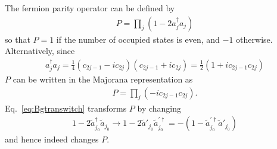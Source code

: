 The fermion parity operator can be defined by
\begin{eqnarray}
	P = \prod_j (1-2a_j^\dag a_j)
\end{eqnarray}
so that $P = 1$ if the number of occupied states is even, and $-1$ otherwise. Alternatively, since
\begin{eqnarray}
	a_j^\dag a_j = \frac{1}{4}(c_{2j-1} - ic_{2j})(c_{2j-1} + ic_{2j}) = \frac{1}{2} (1 + ic_{2j-1} c_{2j})
\end{eqnarray}
$P$ can be written in the Majorana representation as
\begin{eqnarray}\label{eq:Pm}
	P = \prod_j (-i c_{2j-1} c_{2j}).
\end{eqnarray}
Eq.~\ref{eq:Bgtranswitch} transforms $P$ by changing
\begin{eqnarray}
	1 - 2\tilde{a}^\dag_{j_0} \tilde{a}_{j_0}\rightarrow 	1 - 2\tilde{a}'_{j_0}\tilde{a}^{\prime\dag}_{j_0} = - (1-\tilde{a}^{\prime\dag}_{j_0}\tilde{a}'_{j_0})
\end{eqnarray}
and hence indeed changes $P$.

